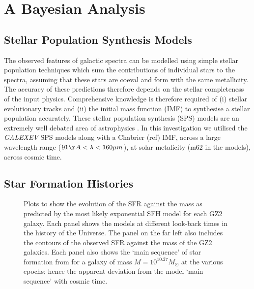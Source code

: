 \documentclass{mn2e}
\begin{document}
\section{A Bayesian Analysis}\label{models}
\subsection{Stellar Population Synthesis Models}\label{SPS}
The observed features of galactic spectra can be modelled using simple stellar population techniques which sum the contributions of individual stars to the spectra, assuming that these stars are coeval and form with the same metallicity. The accuracy of these predictions therefore depends on the stellar completeness of the input physics. Comprehensive knowledge is therefore required of (i) stellar evolutionary tracks and (ii) the initial mass function (IMF) to synthesise a stellar population accurately. These stellar population synthesis (SPS) models are an extremely well debated area of astrophysics \citep{Maraston06, Eminian08, CGW09, Falk09, Chen10, Kreik10, MRC11, Mel12}. In this investigation we utilised the \citet{BC03} \emph{GALEXEV} SPS models along with a Chabrier (ref) IMF, across a large wavelength range ($91 \AA < \lambda < 160 \mu m$), at solar metalicity (m62 in the \citet{BC03} models), across cosmic time. 

\subsection{Star Formation Histories}\label{sfh}
\begin{figure}
\caption{Plots to show the evolution of the SFR against the mass as predicted by the most likely exponential SFH model for each GZ2 galaxy. Each panel shows the models at different look-back times in the history of the Universe. The panel on the far left also includes the contours of the observed SFR against the mass of the GZ2 galaxies. Each panel also shows the `main sequence' of star formation from \citet{Peng} for a galaxy of mass $M=10^{10.27} M_{\odot}$ at the various epochs; hence the apparent deviation from the model `main sequence' with cosmic time.}
\label{sfr_mass_evo}
\end{figure}
\end{document}
